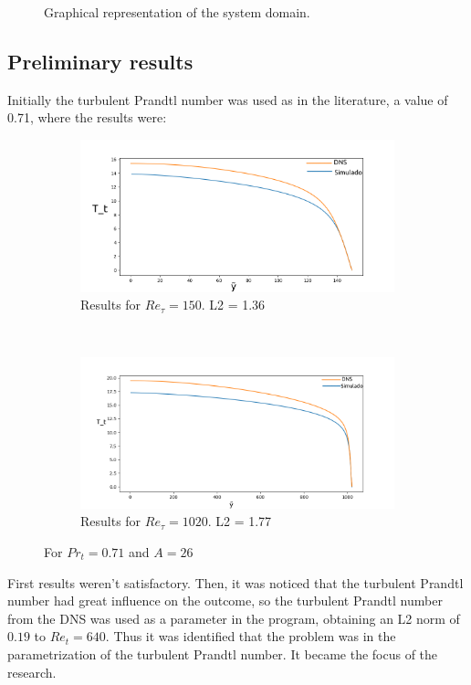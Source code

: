 \documentclass[10pt]{article} %
\begin{document}
\begin{figure}[!h]
	\caption{Graphical representation of the system domain.}
	\label{sistema}
\end{figure}

\subsection{Preliminary results}
Initially the turbulent Prandtl number was used as in the literature, a value of 0.71, where the results were:\\
	\begin{figure}[h!]
		\centering
		\begin{subfigure}[t]{0.45\textwidth}
		\centering
		\includegraphics[angle=0, scale=0.24]{150orto}
		\caption{Results for $Re_\tau = 150$. L2 = 1.36 }
		\end{subfigure}%
		~
		\begin{subfigure}[t]{0.45\textwidth}
		\centering
		\includegraphics[angle=0, scale=0.24]{1020orto}
		\caption{Results for $Re_\tau = 1020$. L2 = 1.77}
		\end{subfigure}
	\caption{For $Pr_t = 0.71$ and $A = 26$} 
	\end{figure}	

First results weren't satisfactory. Then, it was noticed that the turbulent Prandtl number had great influence on the outcome, so the turbulent Prandtl number from the DNS was used as a parameter in the program, obtaining an L2 norm of $ 0.19 $ to $ Re_t = 640 $. Thus it was identified that the problem was in the parametrization of the turbulent Prandtl number. It became the focus of the research.
\end{document}
